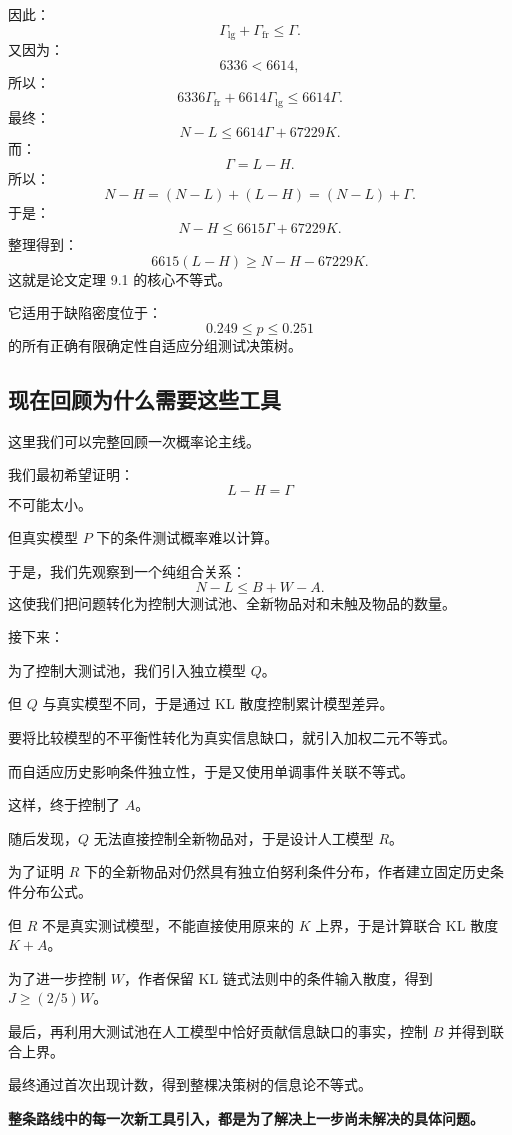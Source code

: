 \documentclass[UTF8,11pt]{ctexart}
\begin{document}
因此：
\[\Gamma_{\mathrm{lg}}+\Gamma_{\mathrm{fr}}\le\Gamma.\]
又因为：
\[6336<6614,\]
所以：
\[6336\Gamma_{\mathrm{fr}}+6614\Gamma_{\mathrm{lg}}\le6614\Gamma.\]
最终：
\begin{equation}\boxed{N-L\le6614\Gamma+67229K.}\tag{43}\end{equation}
而：
\[\Gamma=L-H.\]
所以：
\[N-H=(N-L)+(L-H)=(N-L)+\Gamma.\]
于是：
\[N-H\le6615\Gamma+67229K.\]
整理得到：
\begin{equation}\boxed{6615(L-H)\ge N-H-67229K.}\tag{44}\end{equation}
这就是论文定理 9.1 的核心不等式。

它适用于缺陷密度位于：
\[0.249\le p\le0.251\]
的所有正确有限确定性自适应分组测试决策树。

\subsection{现在回顾为什么需要这些工具}
这里我们可以完整回顾一次概率论主线。

我们最初希望证明：
\[L-H=\Gamma\]
不可能太小。

但真实模型 $P$ 下的条件测试概率难以计算。

于是，我们先观察到一个纯组合关系：
\[N-L\le B+W-A.\]
这使我们把问题转化为控制大测试池、全新物品对和未触及物品的数量。

接下来：

为了控制大测试池，我们引入独立模型 $Q$。

但 $Q$ 与真实模型不同，于是通过 KL 散度控制累计模型差异。

要将比较模型的不平衡性转化为真实信息缺口，就引入加权二元不等式。

而自适应历史影响条件独立性，于是又使用单调事件关联不等式。

这样，终于控制了 $A$。

随后发现，$Q$ 无法直接控制全新物品对，于是设计人工模型 $R$。

为了证明 $R$ 下的全新物品对仍然具有独立伯努利条件分布，作者建立固定历史条件分布公式。

但 $R$ 不是真实测试模型，不能直接使用原来的 $K$ 上界，于是计算联合 KL 散度 $K+A$。

为了进一步控制 $W$，作者保留 KL 链式法则中的条件输入散度，得到 $J\ge(2/5)W$。

最后，再利用大测试池在人工模型中恰好贡献信息缺口的事实，控制 $B$ 并得到联合上界。

最终通过首次出现计数，得到整棵决策树的信息论不等式。

\textbf{整条路线中的每一次新工具引入，都是为了解决上一步尚未解决的具体问题。}
\end{document}
